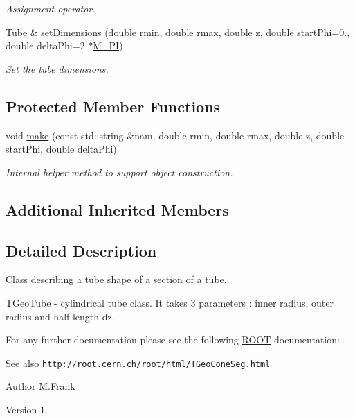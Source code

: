 \begin{DoxyCompactItemize}
\begin{DoxyCompactList}\small\item\em Assignment operator. \end{DoxyCompactList}\item 
\hyperlink{class_d_d4hep_1_1_geometry_1_1_tube}{Tube} \& \hyperlink{class_d_d4hep_1_1_geometry_1_1_tube_aa1a2e428c08cbd8c7b2e89cc4950a0a1}{set\+Dimensions} (double rmin, double rmax, double z, double start\+Phi=0., double delta\+Phi=2 $\ast$\hyperlink{_x_m_l_elements_8h_ae71449b1cc6e6250b91f539153a7a0d3}{M\+\_\+\+PI})
\begin{DoxyCompactList}\small\item\em Set the tube dimensions. \end{DoxyCompactList}\end{DoxyCompactItemize}
\subsection*{Protected Member Functions}
\begin{DoxyCompactItemize}
\item 
void \hyperlink{class_d_d4hep_1_1_geometry_1_1_tube_a2c8ae5a41c16a7b35c4c6ab8894eaf9b}{make} (const std\+::string \&nam, double rmin, double rmax, double z, double start\+Phi, double delta\+Phi)
\begin{DoxyCompactList}\small\item\em Internal helper method to support object construction. \end{DoxyCompactList}\end{DoxyCompactItemize}
\subsection*{Additional Inherited Members}


\subsection{Detailed Description}
Class describing a tube shape of a section of a tube. 

T\+Geo\+Tube -\/ cylindrical tube class. It takes 3 parameters \+: inner radius, outer radius and half-\/length dz.

For any further documentation please see the following \hyperlink{namespace_r_o_o_t}{R\+O\+OT} documentation\+: \begin{DoxySeeAlso}{See also}
\href{http://root.cern.ch/root/html/TGeoConeSeg.html}{\tt http\+://root.\+cern.\+ch/root/html/\+T\+Geo\+Cone\+Seg.\+html}
\end{DoxySeeAlso}
\begin{DoxyAuthor}{Author}
M.\+Frank 
\end{DoxyAuthor}
\begin{DoxyVersion}{Version}
1. 
\end{DoxyVersion}



